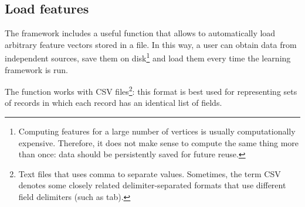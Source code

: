         \subsection{Load features}\label{load_features}
            The framework includes a useful function that allows to automatically load arbitrary feature vectors stored in a file. In this way, a user can obtain data from independent sources, save them on disk\footnote{Computing features for a large number of vertices is usually computationally expensive. Therefore, it does not make sense to compute the same thing more than once: data should be persistently saved for future reuse.} and load them every time the learning framework is run.
            
            The function works with CSV files\footnote{Text files that uses comma to separate values. Sometimes, the term CSV denotes some closely related delimiter-separated formats that use different field delimiters (such as tab).}: this format is best used for representing sets of records in which each record has an identical list of fields.
            
